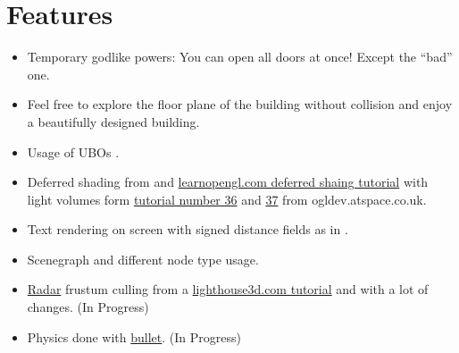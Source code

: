 \documentclass[12pt]{article}
\begin{document}
\section{Features}
\label{Features}
\begin{itemize}
	\item Temporary godlike powers: You can open all doors at once! Except the ``bad'' one.
	\item Feel free to explore the floor plane of the building without collision and enjoy a beautifully designed building.
	\item Usage of UBOs \cite{openGLSuperBible}.
	\item Deferred shading from \cite{openGLSuperBible} and \href{http://learnopengl.com/#!Advanced-Lighting/Deferred-Shading}{learnopengl.com deferred shaing tutorial} with light volumes form
	\href{http://ogldev.atspace.co.uk/www/tutorial36/tutorial36.html}{tutorial number 36} and \href{http://ogldev.atspace.co.uk/www/tutorial37/tutorial37.html}{37} from ogldev.atspace.co.uk.
	\item Text rendering on screen with signed distance fields as in \cite{signedDistanceFields}.
	\item Scenegraph and different node type usage.
  \item \href{https://www.youtube.com/watch?v=2LW9JSYn_h0}{Radar} frustum culling from a \href{http://www.lighthouse3d.com/tutorials/view-frustum-culling/radar-approach-implementation-ii}{lighthouse3d.com tutorial} and \cite{gems5} with a lot of changes. (In Progress)
  \item Physics done with \href{http://bulletphysics.org/wordpress/}{bullet}. (In Progress)
\end{itemize}
\end{document}
